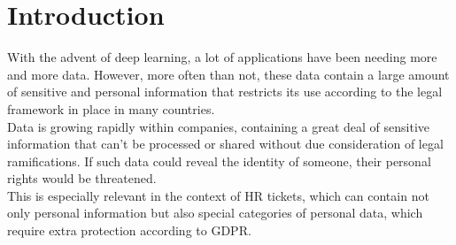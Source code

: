 \chapter{Introduction}
\label{sec:Introduction}


With the advent of deep learning, a lot of applications have been needing more and more data. However, more often than not, these data contain a large amount of sensitive and personal information that restricts its use according to the legal framework in place in many countries. \\
Data is growing rapidly within companies, containing a great deal of sensitive information that can't be processed or shared without due consideration of legal ramifications. If such data could reveal the identity of someone, their personal rights would be threatened. \\
This is especially relevant in the context of HR tickets, which can contain not only personal information but also special categories of personal data, which require extra protection according to GDPR. \\


